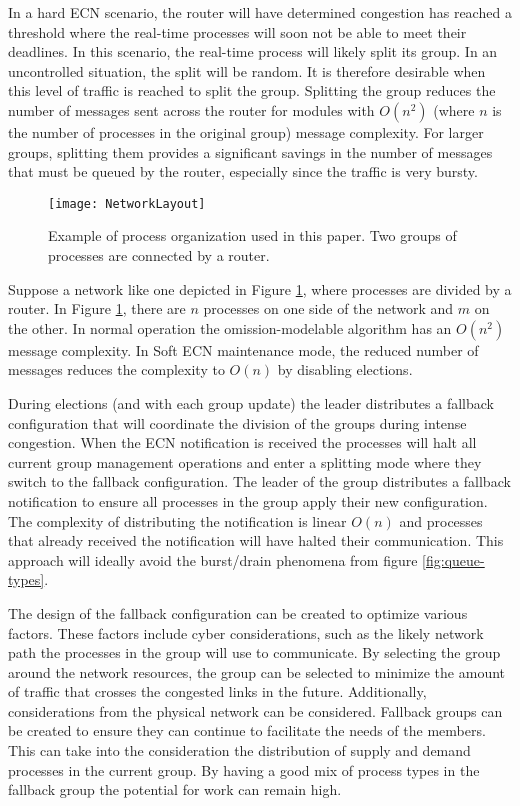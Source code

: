 In a hard \ac{ECN} scenario, the router will have determined congestion has reached a threshold where the real-time processes will soon not be able to meet their deadlines.
In this scenario, the real-time process will likely split its group.
In an uncontrolled situation, the split will be random.
It is therefore desirable when this level of traffic is reached to split the group.
Splitting the group reduces the number of messages sent across the router for modules with $O(n^2)$ (where $n$ is the number of processes in the original group) message complexity.
For larger groups, splitting them provides a significant savings in the number of messages that must be queued by the router, especially since the traffic is very bursty.

\begin{figure}
\texttt{[image: NetworkLayout]}
\caption{Example of process organization used in this paper. Two groups of processes are connected by a router.} \label{fig:network-layout}
\end{figure}

Suppose a network like one depicted in Figure \ref{fig:network-layout}, where processes are divided by a router.
In Figure \ref{fig:network-layout}, there are $n$ processes on one side of the network and $m$ on the other.
In normal operation the omission-modelable algorithm has an $O(n^2)$ message complexity.
In Soft \ac{ECN} maintenance mode, the reduced number of messages reduces the complexity to $O(n)$ by disabling elections.

During elections (and with each group update) the leader distributes a fallback configuration that will coordinate the division of the groups during intense congestion.
When the \ac{ECN} notification is received the processes will halt all current group management operations and enter a splitting mode where they switch to the fallback configuration.
The leader of the group distributes a fallback notification to ensure all processes in the group apply their new configuration. 
The complexity of distributing the notification is linear $O(n)$ and processes that already received the notification will have halted their communication.
This approach will ideally avoid the burst/drain phenomena from figure \ref{fig:queue-types}.

The design of the fallback configuration can be created to optimize various factors.
These factors include cyber considerations, such as the likely network path the processes in the group will use to communicate.
By selecting the group around the network resources, the group can be selected to minimize the amount of traffic that crosses the congested links in the future.
Additionally, considerations from the physical network can be considered.
Fallback groups can be created to ensure they can continue to facilitate the needs of the members.
This can take into the consideration the distribution of supply and demand processes in the current group.
By having a good mix of process types in the fallback group the potential for work can remain high.

